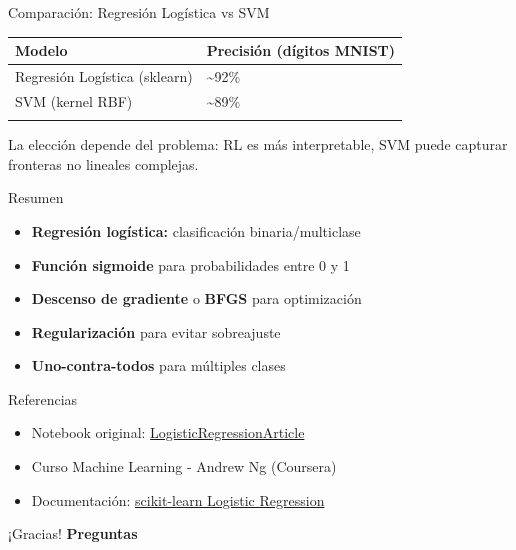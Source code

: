 \documentclass[
  ignorenonframetext,
]{beamer}
\providecommand{\tightlist}{%
  \setlength{\itemsep}{0pt}\setlength{\parskip}{0pt}}
\begin{document}
\begin{frame}
\begin{block}{Comparación: Regresión Logística vs SVM}
\label{comparaciuxf3n-regresiuxf3n-loguxedstica-vs-svm}
\begin{longtable}[]{@{}ll@{}}
\toprule\noalign{}
Modelo & Precisión (dígitos MNIST) \\
\midrule\noalign{}
\endhead
Regresión Logística (sklearn) & \textasciitilde92\% \\
SVM (kernel RBF) & \textasciitilde89\% \\
\bottomrule\noalign{}
\end{longtable}

La elección depende del problema: RL es más interpretable, SVM puede
capturar fronteras no lineales complejas.
\end{block}
\end{frame}

\begin{frame}
\begin{block}{Resumen}
\label{resumen}
\begin{itemize}
\tightlist
\item
  \textbf{Regresión logística:} clasificación binaria/multiclase
\item
  \textbf{Función sigmoide} para probabilidades entre 0 y 1
\item
  \textbf{Descenso de gradiente} o \textbf{BFGS} para optimización
\item
  \textbf{Regularización} para evitar sobreajuste
\item
  \textbf{Uno-contra-todos} para múltiples clases
\end{itemize}
\end{block}
\end{frame}

\begin{frame}
\begin{block}{Referencias}
\label{referencias}
\begin{itemize}
\tightlist
\item
  Notebook original:
  \href{https://github.com/pptr3/personal-blog/blob/master/article/logistic-regression/LogisticRegressionArticle.ipynb}{LogisticRegressionArticle}
\item
  Curso Machine Learning - Andrew Ng (Coursera)
\item
  Documentación:
  \href{https://scikit-learn.org/stable/modules/linear_model.html\#logistic-regression}{scikit-learn
  Logistic Regression}
\end{itemize}
\end{block}
\end{frame}

\begin{frame}{¡Gracias!}
\label{gracias}
\textbf{Preguntas}
\end{frame}
\end{document}
